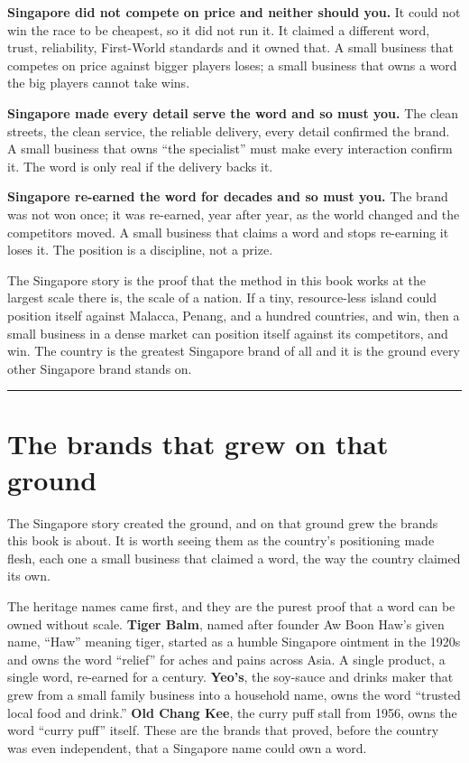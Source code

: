 \documentclass[10pt,twoside,openany]{memoir}
\begin{document}
\textbf{Singapore did not compete on price and neither should you.} It
could not win the race to be cheapest, so it did not run it. It claimed
a different word, trust, reliability, First-World standards and it owned
that. A small business that competes on price against bigger players
loses; a small business that owns a word the big players cannot take
wins.

\textbf{Singapore made every detail serve the word and so must you.} The
clean streets, the clean service, the reliable delivery, every detail
confirmed the brand. A small business that owns ``the specialist'' must
make every interaction confirm it. The word is only real if the delivery
backs it.

\textbf{Singapore re-earned the word for decades and so must you.} The
brand was not won once; it was re-earned, year after year, as the world
changed and the competitors moved. A small business that claims a word
and stops re-earning it loses it. The position is a discipline, not a
prize.

The Singapore story is the proof that the method in this book works at
the largest scale there is, the scale of a nation. If a tiny,
resource-less island could position itself against Malacca, Penang, and
a hundred countries, and win, then a small business in a dense market
can position itself against its competitors, and win. The country is the
greatest Singapore brand of all and it is the ground every other
Singapore brand stands on.

\begin{center}\rule{0.5\linewidth}{0.5pt}\end{center}

\FloatBarrier
\chapter{The brands that grew on that
ground}\label{the-brands-that-grew-on-that-ground}

The Singapore story created the ground, and on that ground grew the
brands this book is about. It is worth seeing them as the country's
positioning made flesh, each one a small business that claimed a word,
the way the country claimed its own.

The heritage names came first, and they are the purest proof that a word
can be owned without scale. \textbf{Tiger Balm}, named after founder Aw
Boon Haw's given name, ``Haw'' meaning tiger, started as a humble
Singapore ointment in the 1920s and owns the word ``relief'' for aches
and pains across Asia. A single product, a single word, re-earned for a
century. \textbf{Yeo's}, the soy-sauce and drinks maker that grew from a
small family business into a household name, owns the word ``trusted
local food and drink.'' \textbf{Old Chang Kee}, the curry puff stall
from 1956, owns the word ``curry puff'' itself. These are the brands
that proved, before the country was even independent, that a Singapore
name could own a word.
\end{document}
